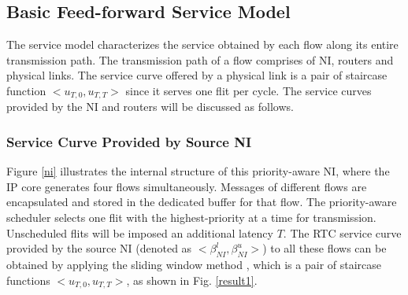 \documentclass[preprint]{elsarticle}
\begin{document}
\subsection{Basic Feed-forward Service Model}\label{sm}
The service model characterizes the service obtained by each flow along its entire transmission path. The transmission path of a flow comprises of NI, routers and physical links. The service curve offered by a physical link is a pair of staircase function $<u_{T,0},u_{T,T}>$ since it serves one flit per cycle. The service curves provided by the NI and routers will be discussed as follows.

\subsubsection{Service Curve Provided by Source NI}
Figure \ref{ni} illustrates the internal structure of this priority-aware NI, where the IP core generates four flows simultaneously. Messages of different flows are encapsulated and stored in the dedicated buffer for that flow. The priority-aware scheduler selects one flit with the highest-priority at a time for transmission. Unscheduled flits will be imposed an additional latency $T$. The RTC service curve provided by the source NI (denoted as $<\beta^l_{NI},\beta^u_{NI}>$) to all these flows can be obtained by applying the sliding window method \cite{1253607}, which is a pair of staircase functions $<u_{T,0},u_{T,T}>$, as shown in Fig. \ref{result1}.
\end{document}
